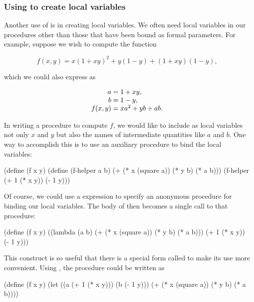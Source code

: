 \subsubsection*{Using  to create local variables}

Another use of  is in creating local variables.  We often need
local variables in our procedures other than those that have been bound as
formal parameters.  For example, suppose we wish to compute the function

$$ f(x,y) = x(1 + xy)^2 + y(1 - y) + (1 + xy)(1 - y), $$

\noindent
which we could also express as

$$
\begin{array}{r@{{}={}}l}
  a 	  &  1 + xy, \\
  b 	  &  1 - y,  \\
  f(x,y)  &  xa^2 + yb + ab.
\end{array}
$$

In writing a procedure to compute \( f \), we would like to include as local
variables not only \( x \) and \( y \) but also the names of intermediate
quantities like \( a \) and \( b \).  One way to accomplish this is to use an
auxiliary procedure to bind the local variables:

\begin{codeBlock}
(define (f x y)
  (define (f-helper a b)
    (+ (* x (square a))
       (* y b)
       (* a b)))
  (f-helper (+ 1 (* x y))
            (- 1 y)))
\end{codeBlock}

\noindent
Of course, we could use a  expression to specify an anonymous
procedure for binding our local variables.  The body of  then becomes a
single call to that procedure:

\begin{codeBlock}
(define (f x y)
  ((lambda (a b)
     (+ (* x (square a))
        (* y b)
        (* a b)))
   (+ 1 (* x y))
   (- 1 y)))
\end{codeBlock}

\noindent
This construct is so useful that there is a special form called  to
make its use more convenient.  Using , the  procedure could
be written as

\begin{codeBlock}
(define (f x y)
  (let ((a (+ 1 (* x y)))
        (b (- 1 y)))
    (+ (* x (square a))
       (* y b)
       (* a b))))
\end{codeBlock}

